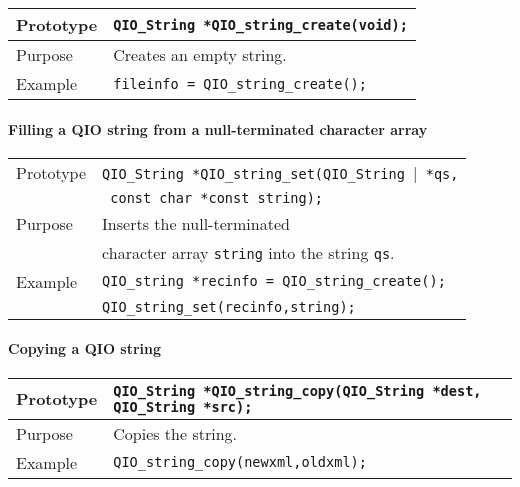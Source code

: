 \documentclass{article}
\newcommand{\QIOstring}{{\tt QIO\_String }}
\begin{document}
\begin{flushleft}
  \begin{tabular}{|l|l|}
  \hline
  Prototype      & \QIOstring \verb|*QIO_string_create(void);|\\
    \hline
  Purpose        & Creates an empty string. \\
   \hline
  Example        & \verb|fileinfo = QIO_string_create();| \\
   \hline
 \end{tabular}
\end{flushleft}
%
\paragraph{Filling a QIO string from a null-terminated character array}

\begin{flushleft}
  \begin{tabular}{|l|l|}
  \hline
  Prototype      & \QIOstring \verb|*QIO_string_set(|\QIOstring|\verb| *qs,| \\
                 & \verb| const char *const string);|\\
    \hline
  Purpose        & Inserts the null-terminated \\
                 & character array \verb|string| into the string \verb|qs|. \\
   \hline
  Example        & \verb|QIO_string *recinfo = QIO_string_create();| \\
                 & \verb|QIO_string_set(recinfo,string);| \\
   \hline
 \end{tabular}
\end{flushleft}
%
\paragraph{Copying a QIO string}

\begin{flushleft}
  \begin{tabular}{|l|l|}
  \hline
  Prototype      & \QIOstring \verb|*QIO_string_copy(|\QIOstring \verb|*dest,| \QIOstring \verb|*src);|\\
    \hline
  Purpose        & Copies the string. \\
   \hline
  Example        & \verb|QIO_string_copy(newxml,oldxml);| \\
   \hline
 \end{tabular}
\end{flushleft}
%
\end{document}
